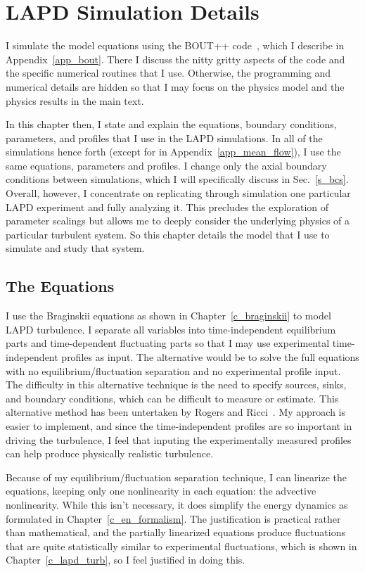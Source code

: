 \chapter{LAPD Simulation Details}
\label{c_lapd_sim}

I simulate the model equations using the BOUT++ code~\cite{dudson2009}, which I describe in Appendix~\ref{app_bout}. 
There I discuss the nitty gritty aspects of the code and the specific numerical routines that
I use. Otherwise, the programming and numerical details are hidden so that I may focus on the physics model and the physics results in the main text.

In this chapter then, I state and explain the equations, boundary conditions, parameters, and profiles that I use in the LAPD simulations. 
In all of the simulations hence forth (except for in Appendix~\ref{app_mean_flow}), I use the same equations, parameters and profiles. I change only the axial boundary conditions between simulations,
which I will specifically discuss in Sec.~\ref{s_bcs}. 
Overall, however, I concentrate on replicating through simulation one particular LAPD experiment and fully analyzing it. This precludes the exploration of
parameter scalings but allows me to deeply consider the underlying physics of a particular turbulent system. So this chapter details the model that I use to simulate and study that system.

\section{The Equations}
\label{s_equations}

I use the Braginskii equations as shown in Chapter~\ref{c_braginskii} to model LAPD turbulence. I separate all variables into time-independent equilibrium parts and time-dependent
fluctuating parts so that I may use experimental time-independent profiles as input. The alternative would be to solve the full equations with no equilibrium/fluctuation separation
and no experimental profile input. The difficulty in this alternative technique is the need to specify sources, sinks, and boundary conditions, which can be difficult to measure or estimate.
This alternative method has been untertaken by Rogers and Ricci~\cite{rogers2010}. My approach is easier to implement, and since the time-independent profiles are so important in driving the turbulence,
I feel that inputing the experimentally measured profiles can help produce physically realistic turbulence.

Because of my equilibrium/fluctuation separation technique, I can linearize the equations, keeping only one nonlinearity in each equation: the
advective nonlinearity. While this isn't necessary, it does simplify the energy dynamics as formulated in Chapter~\ref{c_en_formalism}. The justification is practical rather than mathematical,
and the partially linearized equations produce fluctuations that are quite statistically similar to experimental fluctuations, which is shown in Chapter~\ref{c_lapd_turb}, so I feel justified
in doing this.

